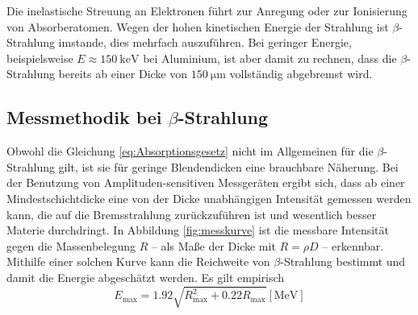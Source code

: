 Die inelastische Streuung an Elektronen führt zur Anregung oder zur Ionisierung von Absorberatomen.
Wegen der hohen kinetischen Energie der Strahlung ist $\beta$-Strahlung imstande, dies mehrfach auszuführen.
Bei geringer Energie, beispielsweise $E\approx\SI{150}{\kilo\electronvolt}$ bei Aluminium, ist aber damit zu rechnen, 
dass die $\beta$-Strahlung bereits ab einer Dicke von $\SI{150}{\micro\meter}$ vollständig abgebremst wird.

\subsection{Messmethodik bei \texorpdfstring{$\beta$}{Beta}-Strahlung}
Obwohl die Gleichung \eqref{eq:Absorptionsgesetz} nicht im Allgemeinen für die $\beta$-Strahlung gilt, ist sie für geringe Blendendicken eine brauchbare Näherung.
Bei der Benutzung von Amplituden-sensitiven Messgeräten ergibt sich, dass ab einer Mindestschichtdicke eine von der Dicke unabhängigen Intensität gemessen werden kann, die auf die Bremsstrahlung zurückzuführen ist und wesentlich besser Materie durchdringt.
In Abbildung \ref{fig:messkurve} ist die messbare Intensität gegen die Massenbelegung $R$ -- als Maße der Dicke mit $R=\rho D$ -- erkennbar.
Mithilfe einer solchen Kurve kann die Reichweite von $\beta$-Strahlung bestimmt und damit die Energie abgeschätzt werden.
Es gilt empirisch
\begin{equation}
	E_\text{max}=1.92\sqrt{R_\text{max}^2+0.22R_\text{max}} [ \si{\mega\electronvolt}]
\end{equation}